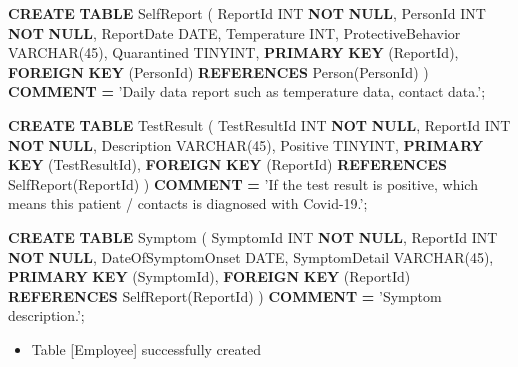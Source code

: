 \documentclass[
]{article}
\newenvironment{Shaded}{\begin{snugshade}}{\end{snugshade}}
\newcommand{\DataTypeTok}[1]{\textcolor[rgb]{0.13,0.29,0.53}{#1}}
\newcommand{\DecValTok}[1]{\textcolor[rgb]{0.00,0.00,0.81}{#1}}
\newcommand{\KeywordTok}[1]{\textcolor[rgb]{0.13,0.29,0.53}{\textbf{#1}}}
\newcommand{\NormalTok}[1]{#1}
\newcommand{\OperatorTok}[1]{\textcolor[rgb]{0.81,0.36,0.00}{\textbf{#1}}}
\newcommand{\StringTok}[1]{\textcolor[rgb]{0.31,0.60,0.02}{#1}}
\providecommand{\tightlist}{%
  \setlength{\itemsep}{0pt}\setlength{\parskip}{0pt}}
\begin{document}
\begin{Shaded}
\begin{Highlighting}[]
\KeywordTok{CREATE} \KeywordTok{TABLE}\NormalTok{ SelfReport (}
\NormalTok{  ReportId }\DataTypeTok{INT} \KeywordTok{NOT} \KeywordTok{NULL}\NormalTok{,}
\NormalTok{  PersonId }\DataTypeTok{INT} \KeywordTok{NOT} \KeywordTok{NULL}\NormalTok{,}
\NormalTok{  ReportDate }\DataTypeTok{DATE}\NormalTok{,}
\NormalTok{  Temperature }\DataTypeTok{INT}\NormalTok{,}
\NormalTok{  ProtectiveBehavior }\DataTypeTok{VARCHAR}\NormalTok{(}\DecValTok{45}\NormalTok{),}
\NormalTok{  Quarantined TINYINT,}
  \KeywordTok{PRIMARY} \KeywordTok{KEY}\NormalTok{ (ReportId),}
  \KeywordTok{FOREIGN} \KeywordTok{KEY}\NormalTok{ (PersonId)}
    \KeywordTok{REFERENCES}\NormalTok{ Person(PersonId)}
\NormalTok{)}
\KeywordTok{COMMENT} \OperatorTok{=} \StringTok{'Daily data report such as temperature data, contact data.'}\NormalTok{;}


\KeywordTok{CREATE} \KeywordTok{TABLE}\NormalTok{ TestResult (}
\NormalTok{  TestResultId }\DataTypeTok{INT} \KeywordTok{NOT} \KeywordTok{NULL}\NormalTok{,}
\NormalTok{  ReportId }\DataTypeTok{INT} \KeywordTok{NOT} \KeywordTok{NULL}\NormalTok{,}
\NormalTok{  Description }\DataTypeTok{VARCHAR}\NormalTok{(}\DecValTok{45}\NormalTok{),}
\NormalTok{  Positive TINYINT,}
  \KeywordTok{PRIMARY} \KeywordTok{KEY}\NormalTok{ (TestResultId),}
  \KeywordTok{FOREIGN} \KeywordTok{KEY}\NormalTok{ (ReportId)}
    \KeywordTok{REFERENCES}\NormalTok{ SelfReport(ReportId)}
\NormalTok{)}
\KeywordTok{COMMENT} \OperatorTok{=} \StringTok{'If the test result is positive, which means this patient / contacts is diagnosed with Covid-19.'}\NormalTok{;}


\KeywordTok{CREATE} \KeywordTok{TABLE}\NormalTok{ Symptom (}
\NormalTok{  SymptomId }\DataTypeTok{INT} \KeywordTok{NOT} \KeywordTok{NULL}\NormalTok{,}
\NormalTok{  ReportId }\DataTypeTok{INT} \KeywordTok{NOT} \KeywordTok{NULL}\NormalTok{,}
\NormalTok{  DateOfSymptomOnset }\DataTypeTok{DATE}\NormalTok{,}
\NormalTok{  SymptomDetail }\DataTypeTok{VARCHAR}\NormalTok{(}\DecValTok{45}\NormalTok{),}
  \KeywordTok{PRIMARY} \KeywordTok{KEY}\NormalTok{ (SymptomId),}
  \KeywordTok{FOREIGN} \KeywordTok{KEY}\NormalTok{ (ReportId)}
    \KeywordTok{REFERENCES}\NormalTok{ SelfReport(ReportId)}
\NormalTok{)}
\KeywordTok{COMMENT} \OperatorTok{=} \StringTok{'Symptom description.'}\NormalTok{;}
\end{Highlighting}
\end{Shaded}

\begin{itemize}
\tightlist
\item
  Table {[}Employee{]} successfully created
\end{itemize}
\end{document}
